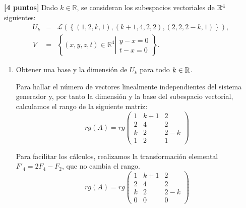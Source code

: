 \documentclass[12pt]{article}
\begin{document}
\begin{ejercicio}
    \textbf{[4 puntos]} Dado $k\in \mathbb{R}$, se consideran los subespacios vectoriales de $\mathbb{R}^4$ siguientes:
    \begin{equation*}
    \begin{array}{rcl}
        U_k & = & \mathcal{L}\left( \left\{ (1,2,k,1),(k+1,4,2,2),(2,2,2-k,1) \right\}\right), \\
        V & = & \left\{(x,y,z,t)\in \mathbb{R}^4 \left|\begin{array}{c}
            y-x=0 \\
            t-x=0 
        \end{array}\right.\right\}.
    \end{array}
    \end{equation*}

    \begin{enumerate}
        \item Obtener una base y la dimensión de $U_k$ para todo $k\in \mathbb{R}$.

        Para hallar el número de vectores linealmente independientes del sistema generador y, por tanto la dimensión y la base del subespacio vectorial, calculamos el rango de la siguiente matriz:
        \begin{equation*}
            rg(A) = rg\left(\begin{array}{ccc}
                1 & k+1 & 2 \\
                2 & 4 & 2 \\
                k & 2 & 2-k \\
                1 & 2 & 1
            \end{array}\right)
        \end{equation*}

        Para facilitar los cálculos, realizamos la transformación elemental $F'_4 = 2F_4 - F_2$, que no cambia el rango.
        \begin{equation*}
            rg(A) = rg\left(\begin{array}{ccc}
                1 & k+1 & 2 \\
                2 & 4 & 2 \\
                k & 2 & 2-k \\
                0 & 0 & 0
            \end{array}\right)
        \end{equation*}


\end{enumerate}
\end{ejercicio}
\end{document}
